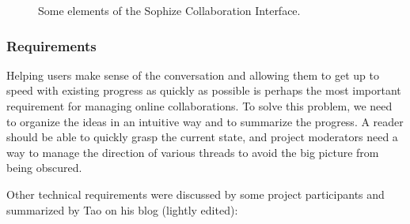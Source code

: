 \documentclass[a4paper]{article}
\begin{document}
\begin{figure}[ht]
\begin{center}
\caption{Some elements of the Sophize Collaboration Interface.}
\label{collab}
\end{center}
\end{figure}

\subsubsection*{Requirements}

Helping users make sense of the conversation and allowing them to get up to speed with existing progress as quickly as possible is perhaps the most important requirement for managing online collaborations. To solve this problem, we need to organize the ideas in an intuitive way and to summarize the progress. A reader should be able to quickly grasp the current state, and project moderators need a way to manage the direction of various threads to avoid the big picture from being obscured.

Other technical requirements were discussed by some project participants and summarized by Tao on his blog \cite{whats_new_2009} (lightly edited):
\end{document}

